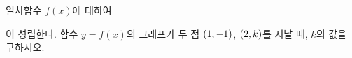 일차함수 $f(x)$에 대하여\par\smallskip{}\par\smallskip\noindent 이 성립한다. 함수 $y=f(x)$의 그래프가 두 점 $(1{,}\mkern3mu\mathopen{}-1)$, $(2{,}\mkern3mu\mathopen{}k)$를 지날 때, $k$의 값을 구하시오.
